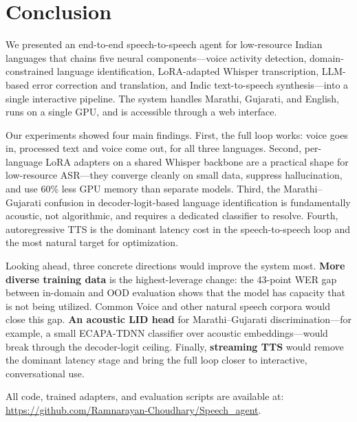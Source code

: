 
\section{Conclusion}
\label{sec:conclusion}

We presented an end-to-end speech-to-speech agent for low-resource Indian languages that chains five neural components---voice activity detection, domain-constrained language identification, LoRA-adapted Whisper transcription, LLM-based error correction and translation, and Indic text-to-speech synthesis---into a single interactive pipeline. The system handles Marathi, Gujarati, and English, runs on a single GPU, and is accessible through a web interface.

Our experiments showed four main findings. First, the full loop works: voice goes in, processed text and voice come out, for all three languages. Second, per-language LoRA adapters on a shared Whisper backbone are a practical shape for low-resource ASR---they converge cleanly on small data, suppress hallucination, and use 60\% less GPU memory than separate models. Third, the Marathi--Gujarati confusion in decoder-logit-based language identification is fundamentally acoustic, not algorithmic, and requires a dedicated classifier to resolve. Fourth, autoregressive TTS is the dominant latency cost in the speech-to-speech loop and the most natural target for optimization.

Looking ahead, three concrete directions would improve the system most. \textbf{More diverse training data} is the highest-leverage change: the 43-point WER gap between in-domain and OOD evaluation shows that the model has capacity that is not being utilized. Common Voice and other natural speech corpora would close this gap. \textbf{An acoustic LID head} for Marathi--Gujarati discrimination---for example, a small ECAPA-TDNN classifier over acoustic embeddings---would break through the decoder-logit ceiling. Finally, \textbf{streaming TTS} would remove the dominant latency stage and bring the full loop closer to interactive, conversational use.

All code, trained adapters, and evaluation scripts are available at: \url{https://github.com/Ramnarayan-Choudhary/Speech_agent}.
